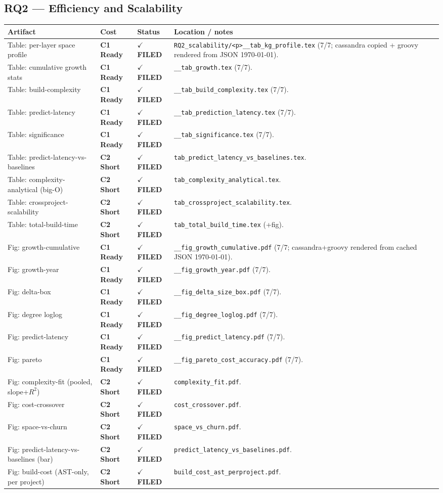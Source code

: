 \documentclass[10pt]{article}
\providecommand{\code}[1]{\texttt{\small #1}}
\newcommand{\Cone}{\textcolor{green!50!black}{\textbf{C1 Ready}}}
\newcommand{\Ctwo}{\textcolor{blue!65!black}{\textbf{C2 Short}}}
\newcommand{\DONE}{\textcolor{green!45!black}{\textbf{$\checkmark$ FILED}}}
\begin{document}
\subsection*{RQ2 --- Efficiency and Scalability}
\begin{longtable}{p{7.0cm}p{1.4cm}p{1.6cm}p{5.4cm}}
\toprule
Artifact & Cost & Status & Location / notes \\ \midrule\endhead
Table: per-layer space profile & \Cone & \DONE & \code{RQ2\_scalability/<p>\_\_tab\_kg\_profile.tex} (7/7; cassandra copied + groovy rendered from JSON \today). \\
Table: cumulative growth stats & \Cone & \DONE & \code{*\_\_tab\_growth.tex} (7/7). \\
Table: build-complexity & \Cone & \DONE & \code{*\_\_tab\_build\_complexity.tex} (7/7). \\
Table: predict-latency & \Cone & \DONE & \code{*\_\_tab\_prediction\_latency.tex} (7/7). \\
Table: significance & \Cone & \DONE & \code{*\_\_tab\_significance.tex} (7/7). \\
Table: predict-latency-vs-baselines & \Ctwo & \DONE & \code{tab\_predict\_latency\_vs\_baselines.tex}. \\
Table: complexity-analytical (big-O) & \Ctwo & \DONE & \code{tab\_complexity\_analytical.tex}. \\
Table: crossproject-scalability & \Ctwo & \DONE & \code{tab\_crossproject\_scalability.tex}. \\
Table: total-build-time & \Ctwo & \DONE & \code{tab\_total\_build\_time.tex} (+fig). \\
Fig: growth-cumulative & \Cone & \DONE & \code{*\_\_fig\_growth\_cumulative.pdf} (7/7; cassandra+groovy rendered from cached JSON \today). \\
Fig: growth-year & \Cone & \DONE & \code{*\_\_fig\_growth\_year.pdf} (7/7). \\
Fig: delta-box & \Cone & \DONE & \code{*\_\_fig\_delta\_size\_box.pdf} (7/7). \\
Fig: degree loglog & \Cone & \DONE & \code{*\_\_fig\_degree\_loglog.pdf} (7/7). \\
Fig: predict-latency & \Cone & \DONE & \code{*\_\_fig\_predict\_latency.pdf} (7/7). \\
Fig: pareto & \Cone & \DONE & \code{*\_\_fig\_pareto\_cost\_accuracy.pdf} (7/7). \\
Fig: complexity-fit (pooled, slope+$R^2$) & \Ctwo & \DONE & \code{complexity\_fit.pdf}. \\
Fig: cost-crossover & \Ctwo & \DONE & \code{cost\_crossover.pdf}. \\
Fig: space-vs-churn & \Ctwo & \DONE & \code{space\_vs\_churn.pdf}. \\
Fig: predict-latency-vs-baselines (bar) & \Ctwo & \DONE & \code{predict\_latency\_vs\_baselines.pdf}. \\
Fig: build-cost (AST-only, per project) & \Ctwo & \DONE & \code{build\_cost\_ast\_perproject.pdf}. \\
\bottomrule
\end{longtable}
\end{document}
